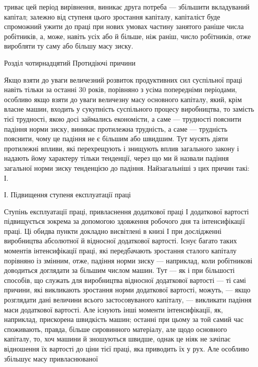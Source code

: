 триває цей період вирівнення, виникає друга потреба — збільшити вкладуваний капітал; залежно від
ступеня цього зростання капіталу, капіталіст буде спроможний ужити до праці при нових умовах частину
занятого раніше числа робітників, а, може, навіть усіх або й більше, ніж раніш, число робітників,
отже виробляти ту саму або більшу масу зиску.

Розділ чотирнадцятий
Протидіючі причини

Якщо взяти до уваги величезний розвиток продуктивних сил суспільної праці навіть тільки за останні
30 років, порівняно з усіма попередніми періодами, особливо якщо взяти до уваги величезну масу
основного капіталу, який, крім власне машин, входить у сукупність суспільного процесу виробництва,
то замість тієї трудності, якою досі займались економісти, а саме — трудності пояснити падіння норми
зиску, виникає протилежна трудність, а саме — трудність пояснити, чому це падіння не є більшим або
швидшим. Тут мусять діяти протилежні впливи, які перехрещують і знищують вплив загального закону і
надають йому характеру тільки тенденції, через що ми й назвали
падіння загальної норми зиску тенденцією до падіння. Найзагальніші з цих причин такі: І.

І. Підвищення ступеня експлуатації праці

Ступінь експлуатації праці, привласнення додаткової праці І додаткової вартості підвищується зокрема
за допомогою здовження робочого дня та інтенсифікації праці. Ці обидва пункти докладно висвітлені в
книзі І при дослідженні виробництва абсолютної й відносної додаткової вартості. Існує багато таких
моментів інтенсифікації праці, які передбачають зростання сталого капіталу порівняно із змінним,
отже, падіння норми зиску — наприклад, коли робітникові доводиться доглядати за більшим числом
машин. Тут — як і при більшості способів, що служать для виробництва відносної додаткової вартості —
ті самі причини, які викликають зростання норми додаткової вартості, можуть, — якщо розглядати дані
величини всього застосовуваного капіталу, — викликати падіння маси додаткової вартості. Але існують
інші моменти інтенсифікації, як, наприклад, прискорена швидкість машин; останні при цьому за той
самий час споживають, правда, більше сировинного матеріалу, але щодо основного капіталу, то, хоч
машини й зношуються швидше, однак це ніяк не зачіпає відношення їх вартості до ціни тієї праці, яка
приводить їх у рух. Але особливо збільшує масу привласнюваної
